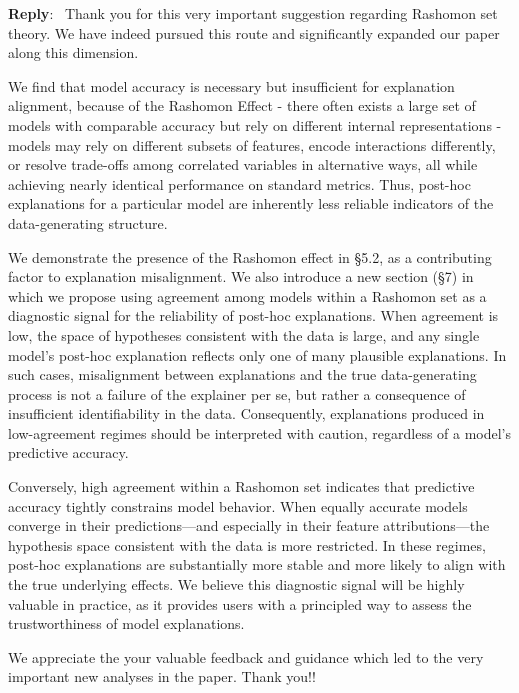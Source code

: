 \documentclass[11pt]{article}
\newcounter{se}[section]
\newenvironment{reply}
 {\par\medskip \noindent \begin{sf}\textbf{Reply}:\ }
 {\medskip \end{sf}}
\begin{document}
\begin{reply}
Thank you for this very important suggestion regarding Rashomon set theory. We have indeed pursued this route and significantly expanded our paper along this dimension. 

We find that model accuracy is necessary but insufficient for explanation alignment, because of the Rashomon Effect - there often exists a large set of models with  comparable accuracy but rely on different
internal representations - models may rely on different
subsets of features, encode interactions differently, or resolve trade-offs among correlated variables
in alternative ways, all while achieving nearly identical performance on standard metrics. Thus, post-hoc explanations for a particular model are inherently less reliable indicators of the
data-generating structure.  

We demonstrate the presence of the Rashomon effect in \S 5.2, as a contributing factor to explanation misalignment. We also introduce a new section (\S 7) in which we propose using agreement among models within a Rashomon set as a diagnostic signal for the reliability of post-hoc explanations. When agreement is low, the space of hypotheses consistent with the data is large, and any single model’s post-hoc explanation reflects only one of many plausible explanations. In such cases, misalignment between explanations and the true data-generating process is not a failure of the explainer per se, but rather a consequence of insufficient identifiability in the data. Consequently, explanations produced in low-agreement regimes should be interpreted with caution, regardless of a model’s predictive accuracy.

Conversely, high agreement within a Rashomon set indicates that predictive accuracy tightly constrains model behavior. When equally accurate models converge in their predictions—and especially in their feature attributions—the hypothesis space consistent with the data is more restricted. In these regimes, post-hoc explanations are substantially more stable and more likely to align with the true underlying effects. We believe this diagnostic signal will be highly valuable in practice, as it provides users with a principled way to assess the trustworthiness of model explanations.

We appreciate the your valuable feedback and guidance which led to the very important new analyses in the paper. Thank you!!
\end{reply}
\end{document}
